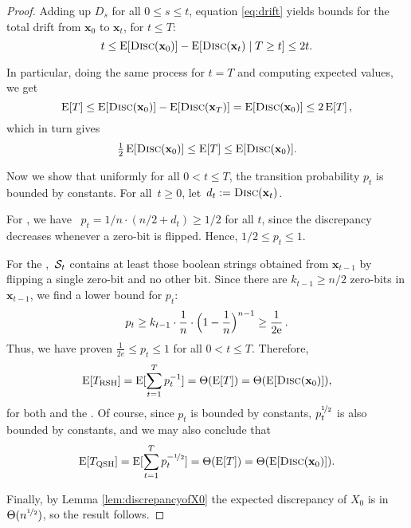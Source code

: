 \begin{proof}
%

Adding up $D_s$ for all $0 \le s \le t$, equation \eqref{eq:drift} yields bounds for the total drift from $\mathbf{x}_0$ to $\mathbf{x}_t$, for $t\leq T$:
\[
t \le \operatorname{E}[\textsc{Disc}(\mathbf{x}_0)]-\operatorname{E}[\textsc{Disc}(\mathbf{x}_t)\mid T \geq t] \le 2t. 
\]

In particular, doing the same process for $t=T$ and computing expected values, we get
\[
\operatorname{E}[T] \le \operatorname{E}[\textsc{Disc}(\mathbf{x}_0)]-\operatorname{E}[\textsc{Disc}(\mathbf{x}_T)]=\operatorname{E}[\textsc{Disc}(\mathbf{x}_0)]\le 2 \operatorname{E}[T]\, , 
\]
which in turn gives 
\[
\tfrac{1}{2}\operatorname{E}[\textsc{Disc}(\mathbf{x}_0)]\le \operatorname{E}[T] \le \operatorname{E}[\textsc{Disc}(\mathbf{x}_0)].
\]

Now we show that uniformly for all $0 < t \le T$, the transition probability $p_t$ is bounded by constants. For all~$t\ge 0$, let~$d_t:=\textsc{Disc}(\mathbf{x}_t)$.

For \rls, we have ~$p_t = 1/n \cdot (n/2 + d_t) \geq 1/2$ for all $t$, since the discrepancy decreases whenever a zero-bit is flipped. Hence, $1/2 \le p_t \le 1$.

For the \ooea,~$\mathcal{S}_t$ contains at least those boolean strings obtained from $\mathbf{x}_{t-1}$ by flipping a single zero-bit and no other bit. Since there are $k_{t-1} \ge n/2$ zero-bits in $\mathbf{x}_{t-1}$, we find a lower bound for $p_t$:
\[
p_t \ge k_{t-1}\cdot\frac{1}{n}\cdot\Big(1-\frac{1}{n}\Big)^{n-1}\ge \frac{1}{2\mathrm{e}}\,.
\]
Thus, we have proven $\frac{1}{2e} \le p_t \le 1$ for all $0 < t \leq T$. Therefore,
\[
\operatorname{E}[T_{\mathrm{RSH}}] = \operatorname{E}[\sum_{t=1}^T p_t^{-1}] = \Theta(\operatorname{E}[T]) = \Theta(\operatorname{E}[\textsc{Disc}(\mathbf{x}_0)]),
\]
for both \rls and the \ooea. Of course, since $p_t$ is bounded by constants, $p_t^{\nicefrac{1}{2}}$ is also bounded by constants, and we may also conclude that
\[
\operatorname{E}[T_{\mathrm{QSH}}] = \operatorname{E}[\sum_{t=1}^T p_t^{-\nicefrac{1}{2}}] = \Theta(\operatorname{E}[T]) = \Theta(\operatorname{E}[\textsc{Disc}(\mathbf{x}_0)]).
\]

Finally, by Lemma \ref{lem:discrepancyofX0} the expected discrepancy of $X_0$ is in $\Theta(n^{\nicefrac{1}{2}})$, so the result follows.
\end{proof}

